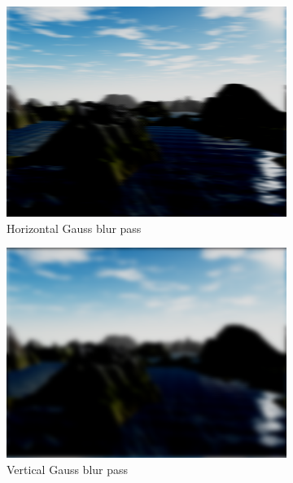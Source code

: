 \documentclass[11pt,a4paper,twoside,openright]{report}
\begin{document}
\begin{figure}[h]
\begin{subfigure}[b]{0.32\textwidth}
    \includegraphics[width=\textwidth]{shader2-horizontal-blur-screenshot.png}
    \caption{Horizontal Gauss blur pass}
    \label{fig:3rdpass}
  \end{subfigure}
  \begin{subfigure}[b]{0.32\textwidth}
    \includegraphics[width=\textwidth]{shader3-vertical-blur-screenshot.png}
    \caption{Vertical Gauss blur pass}
    \label{fig:4thpass}
  \end{subfigure}
  \begin{subfigure}[b]{0.32\textwidth}

\end{subfigure}
\end{figure}
\end{document}
